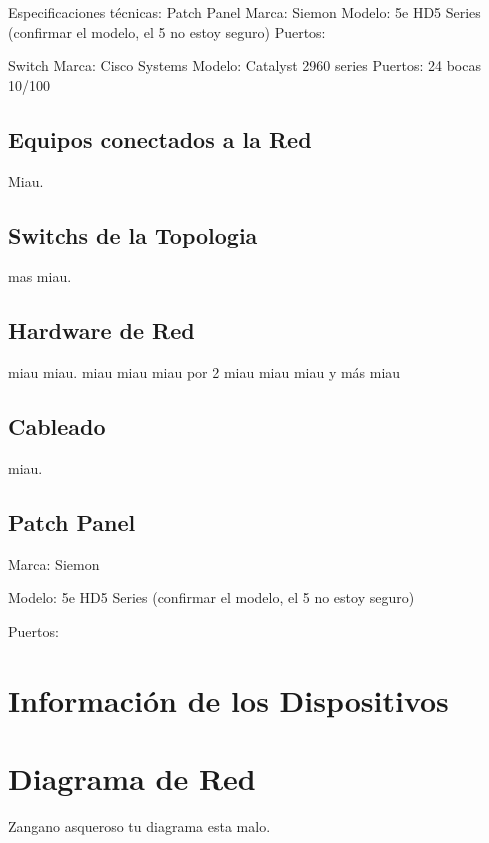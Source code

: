 \documentclass[spanish]{udpreport}
\begin{document}
Especificaciones técnicas:
Patch Panel
Marca: Siemon
Modelo: 5e HD5 Series (confirmar el modelo, el 5 no estoy seguro)
Puertos:

Switch
Marca: Cisco Systems
Modelo: Catalyst 2960 series
Puertos: 24 bocas 10/100

\section{Equipos conectados a la Red}
Miau.

\section{Switchs de la Topologia}
mas miau.

\section{Hardware de Red}
miau miau.
miau miau miau por 2
miau miau miau y más miau
\section{Cableado}
miau.

\section{Patch Panel}
Marca: Siemon

Modelo: 5e HD5 Series (confirmar el modelo, el 5 no estoy seguro)

Puertos:

\chapter{Información de los Dispositivos}

\chapter{Diagrama de Red}
Zangano asqueroso tu diagrama esta malo.

\listoffigures
\end{document}
